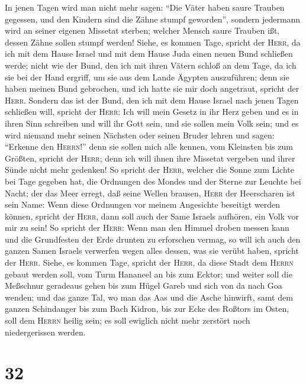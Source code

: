  In jenen Tagen wird man nicht mehr sagen: ``Die Väter
haben saure Trauben gegessen, und den Kindern sind die Zähne stumpf
geworden'',  sondern jedermann wird an seiner eigenen
Missetat sterben; welcher Mensch saure Trauben ißt, dessen Zähne sollen
stumpf werden!  Siehe, es kommen Tage, spricht der
\textsc{Herr}, da ich mit dem Hause Israel und mit dem Hause Juda einen
neuen Bund schließen werde;  nicht wie der Bund, den ich
mit ihren Vätern schloß an dem Tage, da ich sie bei der Hand ergriff, um
sie aus dem Lande Ägypten auszuführen; denn sie haben meinen Bund
gebrochen, und ich hatte sie mir doch angetraut, spricht der
\textsc{Herr}.  Sondern das ist der Bund, den ich mit dem
Hause Israel nach jenen Tagen schließen will, spricht der \textsc{Herr}:
Ich will mein Gesetz in ihr Herz geben und es in ihren Sinn schreiben
und will ihr Gott sein, und sie sollen mein Volk sein; 
und es wird niemand mehr seinen Nächsten oder seinen Bruder lehren und
sagen: ``Erkenne den \textsc{Herrn}!'' denn sie sollen mich alle kennen,
vom Kleinsten bis zum Größten, spricht der \textsc{Herr}; denn ich will
ihnen ihre Missetat vergeben und ihrer Sünde nicht mehr gedenken!
 So spricht der \textsc{Herr}, welcher die Sonne zum
Lichte bei Tage gegeben hat, die Ordnungen des Mondes und der Sterne zur
Leuchte bei Nacht; der das Meer erregt, daß seine Wellen brausen,
\textsc{Herr} der Heerscharen ist sein Name:  Wenn diese
Ordnungen vor meinem Angesichte beseitigt werden können, spricht der
\textsc{Herr}, dann soll auch der Same Israels aufhören, ein Volk vor
mir zu sein!  So spricht der \textsc{Herr}: Wenn man den
Himmel droben messen kann und die Grundfesten der Erde drunten zu
erforschen vermag, so will ich auch den ganzen Samen Israels verwerfen
wegen alles dessen, was sie verübt haben, spricht der \textsc{Herr}.
 Siehe, es kommen Tage, spricht der \textsc{Herr}, da
diese Stadt dem \textsc{Herrn} gebaut werden soll, vom Turm Hananeel an
bis zum Ecktor;  und weiter soll die Meßschnur geradeaus
gehen bis zum Hügel Gareb und sich von da nach Goa wenden;
 und das ganze Tal, wo man das Aas und die Asche
hinwirft, samt dem ganzen Schindanger bis zum Bach Kidron, bis zur Ecke
des Roßtors im Osten, soll dem \textsc{Herrn} heilig sein; es soll
ewiglich nicht mehr zerstört noch niedergerissen werden.

\hypertarget{section-31}{%
\section{32}\label{section-31}}

